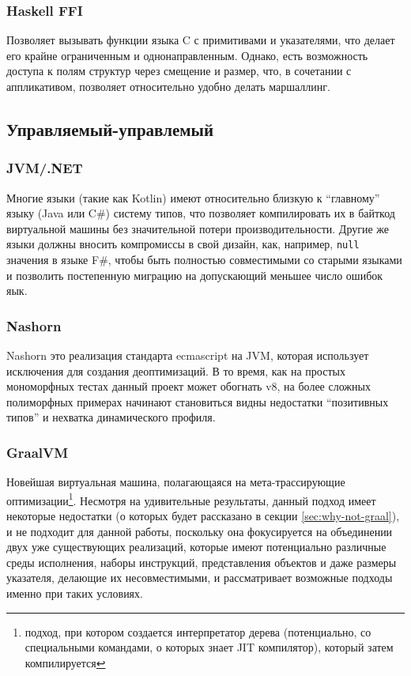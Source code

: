 \documentclass[times,specification,annotation]{itmo-student-thesis}
\begin{document}
\subsubsection{Haskell FFI}
Позволяет вызывать функции языка C с примитивами и указателями, что делает его крайне ограниченным и однонаправленным. Однако, есть возможность доступа к полям структур через смещение и размер, что, в сочетании с аппликативом, позволяет относительно удобно делать маршаллинг.

\subsection{Управляемый-управлемый}
\subsubsection{JVM/.NET}
Многие языки (такие как Kotlin) имеют относительно близкую к ``главному'' языку (Java или C\#) систему типов, что позволяет компилировать их в байткод виртуальной машины без значительной потери производительности. Другие же языки должны вносить компромиссы в свой дизайн, как, например, \texttt{null} значения в языке F\#, чтобы быть полностью совместимыми со старыми языками и позволить постепенную миграцию на допускающий меньшее число ошибок яык.
\subsubsection{Nashorn}
Nashorn это реализация стандарта ecmascript на JVM, которая использует исключения для создания деоптимизаций. В то время, как на простых мономорфных тестах данный проект может обогнать v8, на более сложных полиморфных примерах начинают становиться видны недостатки ``позитивных типов'' и нехватка динамического профиля.

\subsubsection{GraalVM}
Новейшая виртуальная машина, полагающаяся на мета-трассирующие оптимизации\footnote{подход, при котором создается интерпретатор дерева (потенциально, со специальными командами, о которых знает JIT компилятор), который затем компилируется}. Несмотря на удивительные результаты, данный подход имеет некоторые недостатки (о которых будет рассказано в секции \ref{sec:why-not-graal}), и не подходит для данной работы, поскольку она фокусируется на объединении двух уже существующих реализаций, которые имеют потенциально различные среды исполнения, наборы инструкций, представления объектов и даже размеры указателя, делающие их несовместимыми, и рассматривает возможные подходы именно при таких условиях.
\end{document}
